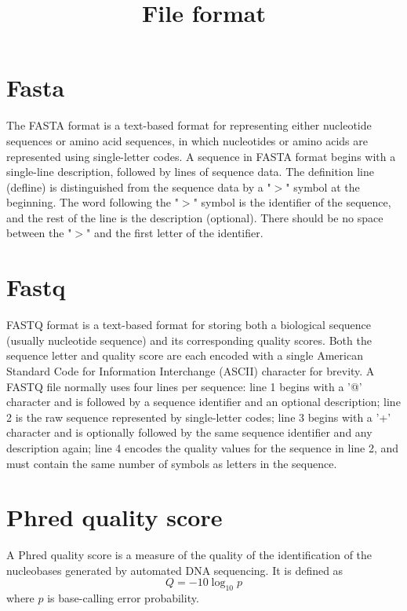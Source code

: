 \documentclass[11pt]{article}
\title{File format}
\date{}
\begin{document}
  \maketitle

  \linenumbers
\section{Fasta}
The FASTA format is a text-based format for representing either nucleotide sequences or amino acid sequences, in which nucleotides or amino acids are represented using single-letter codes. 
A sequence in FASTA format begins with a single-line description, followed by lines of sequence data. 
The definition line (defline) is distinguished from the sequence data by a "$>$" symbol at the beginning. 
The word following the "$>$" symbol is the identifier of the sequence, and the rest of the line is the description (optional). 
There should be no space between the "$>$" and the first letter of the identifier. 

\section{Fastq}
FASTQ format is a text-based format for storing both a biological sequence (usually nucleotide sequence) and its corresponding quality scores. 
Both the sequence letter and quality score are each encoded with a single American Standard Code for Information Interchange (ASCII) character for brevity. 
A FASTQ file normally uses four lines per sequence: 
line 1 begins with a '@' character and is followed by a sequence identifier and an optional description; 
line 2 is the raw sequence represented by single-letter codes; 
line 3 begins with a '+' character and is optionally followed by the same sequence identifier and any description again; 
line 4 encodes the quality values for the sequence in line 2, and must contain the same number of symbols as letters in the sequence.

\section{Phred quality score}
A Phred quality score is a measure of the quality of the identification of the nucleobases generated by automated DNA sequencing. 
It is defined as 
\begin{equation}
  Q = -10\log_{10}p
\end{equation}
where $p$ is base-calling error probability. 
\end{document}
